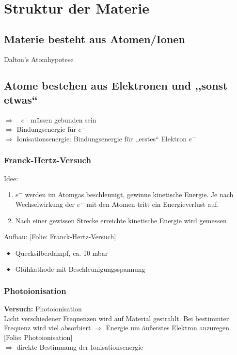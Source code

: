 \documentclass[titlepage,11pt,a4paper,ngerman]{report}
\newcommand{\folie}[1]{\color{gray}[Folie: #1]\color{black}}
\newcommand{\versuch}[1]{\color{red!50!black} \textbf{Versuch:} \color{black} #1\\ }
\begin{document}
\section{Struktur der Materie}

\subsection{Materie besteht aus Atomen/Ionen}

Dalton's Atomhypotese

\subsection{Atome bestehen aus Elektronen und ,,sonst etwas``}

$ \Rightarrow \quad e^- $ müssen gebunden sein\\
$ \Rightarrow $ Bindungsenergie für $ e^- $\\
$ \Rightarrow $ Ionisationsenergie: Bindungsenergie für ,,erstes`` Elektron $ e^- $

\subsubsection{Franck-Hertz-Versuch}

Idee:
\begin{enumerate}[1)]
	\item $ e^- $ werden im Atomgas beschleunigt, gewinne kinetische Energie. Je nach Wechselwirkung der $ e^- $ mit den Atomen tritt ein Energieverlust auf.
	\item Nach einer gewissen Strecke erreichte kinetische Energie wird gemessen
\end{enumerate}
Aufbau:
\folie{Franck-Hertz-Versuch}
\begin{itemize}
	\item Quecksilberdampf, ca. 10 mbar
	\item Glühkathode mit Beschleunigungsspannung
\end{itemize}


\subsubsection{Photoionisation}

\versuch{Photoionisation}
Licht verschiedener Frequenzen wird auf Material gestrahlt. Bei bestimmter Frequenz wird viel absorbiert $ \Rightarrow $ Energie um äußerstes Elektron anzuregen.\\[5pt]
\folie{Photoionisation}\\
$ \Rightarrow $ direkte Bestimmung der Ionisationsenergie
\end{document}
